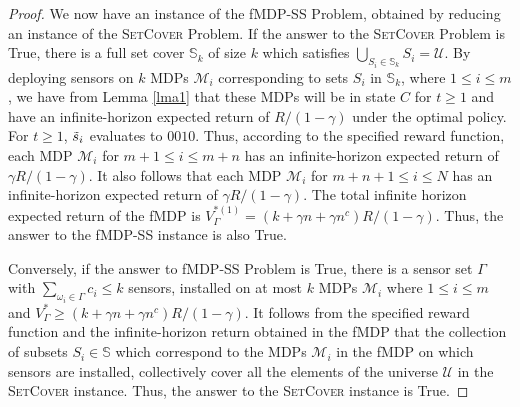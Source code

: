 \documentclass[twocolumn]{autart}    %
\begin{document}
\begin{proof}
 We now have an instance of the fMDP-SS Problem, obtained by reducing an instance of the \textsc{SetCover} Problem. If the answer to the \textsc{SetCover} Problem is True, there is a full set cover $\mathbb{S}_k$ of size $k$ which satisfies $\bigcup_{S_i \in \mathbb{S}_k} S_i = \mathcal{U}$. By deploying sensors on $k$ MDPs $\mathcal{M}_i$ corresponding to sets $S_i$ in $\mathbb{S}_k$, where $1 \leq i \leq m$, we have from Lemma \ref{lma1} that these MDPs will be in state $C$ for $t \geq 1$ and have an infinite-horizon expected return of $R/(1-\gamma)$ under the optimal policy. For $t\geq 1$, $\Tilde{s}_i$ evaluates to $0010$. Thus, according to the specified reward function, each MDP $\mathcal{M}_i$ for $m+1 \leq i \leq m+n$ has an infinite-horizon expected return of $\gamma R/(1-\gamma)$. It also follows that each MDP $\mathcal{M}_i$ for $m+n+1 \leq i \leq N$ has an infinite-horizon expected return of $\gamma R/(1-\gamma)$. The total infinite horizon expected return of the fMDP is  $V_{\Gamma}^{*(1)} = (k+\gamma n+ \gamma n^c) R/(1-\gamma)$. Thus, the answer to the fMDP-SS instance is also True. 
  
  Conversely, if the answer to fMDP-SS Problem is True, there is a sensor set $\Gamma$ with $\sum_{\omega_i \in \Gamma} c_i \leq k$ sensors, installed on at most $k$ MDPs $\mathcal{M}_i$ where $1 \leq i \leq m$ and $V_{\Gamma}^* \geq (k + \gamma n + \gamma n^c) R/(1-\gamma)$. It follows from the specified reward function and the infinite-horizon return obtained in the fMDP that the collection of subsets $S_i \in \mathbb{S}$ which correspond to the MDPs $\mathcal{M}_i$ in the fMDP on which sensors are installed, collectively cover all the elements of the universe $\mathcal{U}$ in the \textsc{SetCover} instance. Thus, the answer to the \textsc{SetCover} instance is True.
  

\end{proof}
\end{document}

